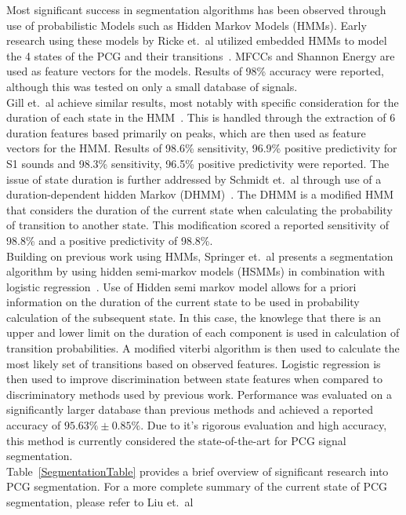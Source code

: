 \documentclass[titlepage, 12pt]{scrartcl} \usepackage{enumitem}
\begin{document}
Most significant success in segmentation algorithms has been observed through use
of probabilistic Models such as Hidden Markov Models (HMMs). Early research
using these models by Ricke et.\ al utilized embedded HMMs to model the 4
states of the PCG and their transitions~\citeyearpar{Ricke2005}. MFCCs and
Shannon Energy are used as feature vectors for the models. Results of
98\% accuracy were reported, although this was tested on only a small database
of signals.\\
Gill et.\ al achieve similar results, most notably with specific consideration
for the duration of each state in the HMM~\citeyearpar{Gill2005}. This is
handled through the extraction of 6 duration features based primarily on peaks,
which are then used as feature vectors for the HMM. Results of 98.6\%
sensitivity, 96.9\% positive predictivity for S1 sounds and 98.3\% sensitivity,
96.5\% positive predictivity were reported.
The issue of state duration is further addressed by Schmidt et.\ al through use
of a duration-dependent hidden Markov (DHMM)~\citeyearpar{Schmidt2015}. The
DHMM is a modified HMM that considers the duration of the current state when
calculating the probability of transition to another state. This modification
scored a reported sensitivity of 98.8\% and a positive predictivity of
98.8\%.\\
Building on previous work using HMMs, Springer et.\ al presents a segmentation
algorithm by using hidden semi-markov models (HSMMs) in combination with
logistic regression~\citeyearpar{Springer2016}. Use of Hidden semi markov model
allows for a priori information on the duration of the current state to be used
in probability calculation of the subsequent state. In this case, the knowlege
that there is an upper and lower limit on the duration of each component is
used in calculation of transition probabilities.  A modified viterbi algorithm
is then used to calculate the most likely set of transitions based on observed
features. Logistic regression is then used to improve discrimination between
state features when compared to discriminatory methods used by previous work.
Performance was evaluated on a significantly larger database than previous
methods and achieved a reported accuracy of $95.63\% \pm 0.85\%$. Due to it's
rigorous evaluation and high accuracy, this method is currently considered the
state-of-the-art for PCG signal segmentation.\\

Table~\ref{SegmentationTable} provides a brief overview of significant research
into PCG segmentation. For a more complete summary of the current state of PCG
segmentation, please refer to Liu et.\ al~\citeyearpar{Liu2016}
\end{document}

